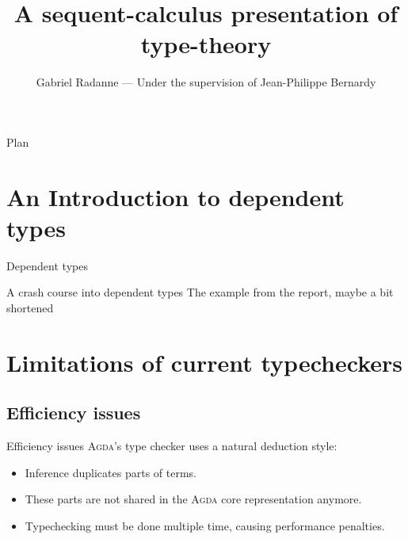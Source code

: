 \documentclass[xcolor=svgnames,11pt]{beamer}
\title{A sequent-calculus presentation of type-theory}
\author[Gabriel Radanne]{Gabriel Radanne --- Under the supervision of Jean-Philippe Bernardy}
\institute[ENS Rennes]{ENS Rennes --- Chalmers University of Technology}
\newcommand{\agda}{\textsc{Agda}\xspace}
\begin{document}
\begin{frame}[plain]
\titlepage
\end{frame}

\begin{frame}{Plan}
\tableofcontents%
\end{frame}

\section{An Introduction to dependent types}

\begin{frame}{Dependent types}

\end{frame}

\begin{frame}{A crash course into dependent types}
The example from the report, maybe a bit shortened
\end{frame}

\section{Limitations of current typecheckers}

\subsection{Efficiency issues}
\begin{frame}{Efficiency issues}
  \agda's type checker uses a natural deduction style:
  \begin{itemize}
  \item Inference duplicates parts of terms.
  \item These parts are not shared in the \agda core representation anymore.
  \item Typechecking must be done multiple time, causing performance penalties.
  \end{itemize}
  \pause
  \begin{figure}
    \centering
  \end{figure}
\end{frame}
\end{document}
